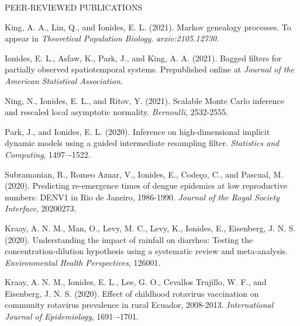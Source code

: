 \begin{reflist}{PEER-REVIEWED PUBLICATIONS}


\item  King, A. A., Lin, Q., and Ionides, E. L. (2021). Markov genealogy processes. To appear in {\em Theoretical Population Biology}. {\it arxiv:2105.12730}.
  
\item  Ionides, E. L., Asfaw, K., Park, J., and King, A. A. (2021). Bagged filters for partially observed spatiotemporal systems. Prepublished online at {\em Journal of the American Statistical Association}. 

\item Ning, N., Ionides, E. L., and Ritov, Y. (2021). Scalable Monte Carlo inference and rescaled local asymptotic normality. {\em Bernoulli}, {}{\separator}2532-2555.
  
  \item Park, J., and Ionides, E. L. (2020). Inference on high-dimensional implicit dynamic models using a guided intermediate resampling filter. {\em Statistics and Computing}, {}{\separator}1497–-1522.

\item Subramanian, R., Romeo Aznar, V., Ionides, E., Code{\c c}o, C., and Pascual, M. (2020). Predicting re-emergence times of dengue epidemics at low reproductive numbers: DENV1 in Rio de Janeiro, 1986-1990. {\em Journal of the Royal Society Interface}, {}{\separator}20200273. 

\item Kraay, A. N. M., Man, O., Levy, M. C., Levy, K., Ionides, E., Eisenberg, J. N. S. (2020). Understanding the impact of rainfall on diarrhea: Testing the concentration-dilution hypothesis using a systematic review and meta-analysis. {\em Environmental Health Perspectives}, {}{\separator}126001.
  
\item Kraay, A. N. M., Ionides, E. L., Lee, G. O., Cevallos Trujillo, W. F., and Eisenberg, J. N. S. (2020). Effect of childhood rotavirus vaccination on community rotavirus prevalence in rural Ecuador, 2008-2013. {\em International Journal of Epidemiology}, {}{\separator}1691–-1701.
  

\end{reflist}
